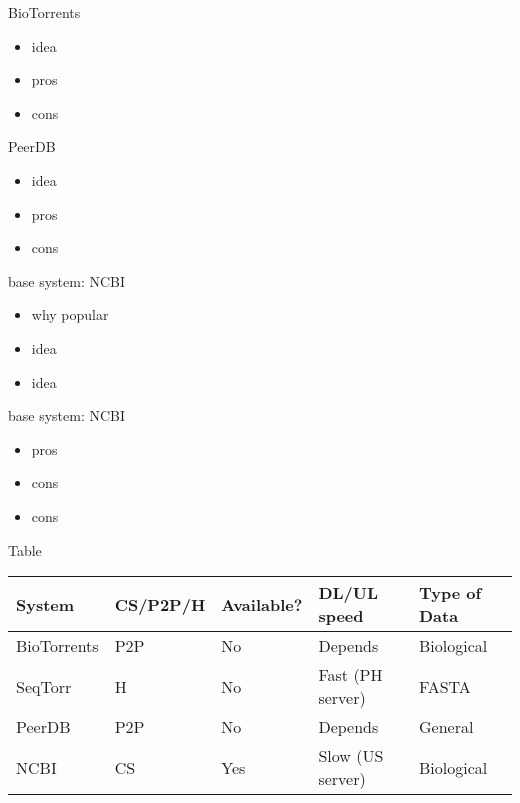 \documentclass{beamer}
\begin{document}
\begin{frame}{BioTorrents}
  \begin{itemize}   
    \item idea
    \item pros
    \item cons
  \end{itemize}
\end{frame}

\begin{frame}{PeerDB}
  \begin{itemize}   
    \item idea
    \item pros
    \item cons
  \end{itemize}
\end{frame}

\begin{frame}{base system: NCBI}
  \begin{itemize}   
    \item why popular
    \item idea
    \item idea
  \end{itemize}
\end{frame}

\begin{frame}{base system: NCBI}
  \begin{itemize}   
    \item pros
    \item cons
    \item cons
  \end{itemize}
\end{frame}

\begin{frame}{Table}
   \begin{table}[]
        \begin{tabular}{|l|l|l|l|l|}
        \hline
        System      & CS/P2P/H & Available? & DL/UL speed & Type of Data \\ \hline
        BioTorrents & P2P           & No         & Depends                    & Biological  \\ \hline
        SeqTorr     & H             & No         & Fast (PH server)           & FASTA        \\ \hline
        PeerDB      & P2P           & No         & Depends                    & General      \\ \hline
        NCBI        & CS            & Yes        & Slow (US server)           & Biological  \\ \hline
        \end{tabular}
    \end{table} 
\end{frame}
\end{document}
